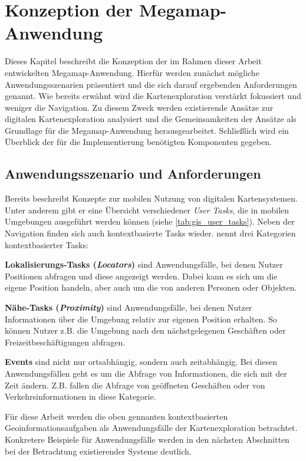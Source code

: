 \chapter{Konzeption der Megamap-Anwendung}
Dieses Kapitel beschreibt die Konzeption der im Rahmen dieser Arbeit entwickelten Megamap-Anwendung.
Hierfür werden zunächst mögliche Anwendungsszenarien präsentiert und die sich darauf ergebenden Anforderungen genannt.
Wie bereits erwähnt wird die Kartenexploration verstärkt fokussiert und weniger die Navigation.
Zu diesem Zweck werden existierende Ansätze zur digitalen Kartenexploration analysiert und die Gemeinsamkeiten der Ansätze als Grundlage für die Megamap-Anwendung herausgearbeitet.
Schließlich wird ein Überblick der für die Implementierung benötigten Komponenten gegeben.

\section{Anwendungsszenario und Anforderungen}
Bereits \textcite{Reichenbacher2001} beschreibt Konzepte zur mobilen Nutzung von digitalen Kartensystemen.
Unter anderem gibt er eine Übersicht verschiedener \emph{User Tasks}, die in mobilen Umgebungen ausgeführt werden können (siehe \autoref{tab:gis_user_tasks}).
Neben der Navigation finden sich auch kontextbasierte Tasks wieder.
\citeauthor{Reichenbacher2001} nennt drei Kategorien kontextbasierter Tasks:

\textbf{Lokalisierungs-Tasks (\emph{Locators})} sind Anwendungsfälle, bei denen Nutzer Positionen abfragen und diese angezeigt werden.
Dabei kann es sich um die eigene Position handeln, aber auch um die von anderen Personen oder Objekten.

\textbf{Nähe-Tasks (\emph{Proximity})} sind Anwendungsfälle, bei denen Nutzer Informationen über die Umgebung relativ zur eigenen Position erhalten.
So können Nutzer z.B. die Umgebung nach den nächstgelegenen Geschäften oder Freizeitbeschäftigungen abfragen.

\textbf{Events} sind nicht nur ortsabhängig, sondern auch zeitabhängig.
Bei diesen Anwendungsfällen geht es um die Abfrage von Informationen, die sich mit der Zeit ändern.
Z.B. fallen die Abfrage von geöffneten Geschäften oder von Verkehrsinformationen in diese Kategorie.

Für diese Arbeit werden die oben gennanten kontextbasierten Geoinformationsaufgaben als Anwendungsfälle der Kartenexploration betrachtet.
Konkretere Beispiele für Anwendungsfälle werden in den nächsten Abschnitten bei der Betrachtung existierender Systeme deutlich.

